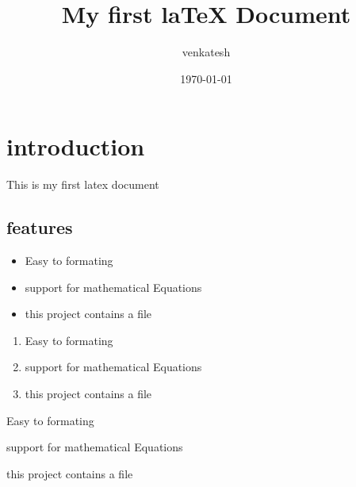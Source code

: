 \documentclass{article}
\title{My first laTeX Document}
\author{venkatesh}
\date{\today}
\begin{document}
	\maketitle
	\section{introduction}
	This is my first latex document
	\subsection{features}
	\begin{itemize}
		\item Easy to formating
		\item support for mathematical Equations
		\item this project contains a file
	\end{itemize}

	\begin{enumerate}
	\item Easy to formating
	\item support for mathematical Equations
	\item this project contains a file
\end{enumerate}

\begin{description}
	\item Easy to formating
	\item support for mathematical Equations
	\item this project contains a file
\end{description}
\end{document}
